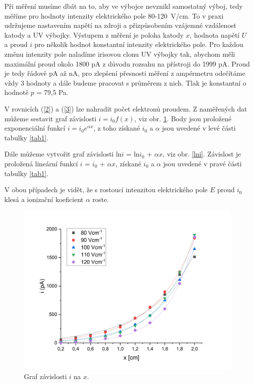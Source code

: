 \documentclass[a4paper,12pt]{article}
\begin{document}
Při měření musíme dbát na to, aby ve výbojce nevznikl samostatný výboj, tedy měříme pro hodnoty intenzity elektrického pole 80-120~V/cm. To v praxi udržujeme nastavením napětí na zdroji a přizpůsobením vzájemné vzdálenost katody a UV výbojky. Výstupem z měření je poloha katody $x$, hodnota napětí $U$ a proud $i$ pro několik hodnot konstantní intenzity elektrického pole. Pro každou změnu intenzity pole naladíme irisovou clonu UV výbojky tak, abychom měli maximální proud okolo 1800 pA z důvodu rozsahu na přístroji do 1999 pA. Proud je tedy řádově pA až nA, pro zlepšení přesnosti měření z ampérmetru odečítáme vždy 3 hodnoty a dále budeme pracovat s průměrem z nich. Tlak je konstantní o hodnotě $p$ = 79,5 Pa.

V rovnicích (\ref{2}) a (\ref{3}) lze nahradit počet elektronů proudem. Z naměřených dat můžeme sestavit graf závislosti $i = i_0 f(x)$, viz obr. \ref{ifx}. Body jsou proložené exponenciální funkcí $i = i_0 e^{\alpha x}$, z toho získané $i_0$ a $\alpha$ jsou uvedené v levé části tabulky \ref{tab1}.

Dále můžeme vytvořit graf závislosti ln$i$ = ln$i_0$ + $\alpha x$, viz obr. \ref{lni}. Závislost je proložená lineární funkcí $i$ = $i_0$ + $\alpha x$, získané $i_0$ a $\alpha$ jsou uvedené v pravé části tabulky \ref{tab1}.

V obou případech je vidět, že s rostoucí intenzitou elektrického pole $E$ proud $i_0$ klesá a ionizační koeficient $\alpha$ roste.

\begin{figure}[h!]
	\centering
	\includegraphics[width=145mm]{ifx.png}
	\caption{Graf závislosti $i$ na $x$.}
	\label{ifx}
\end{figure}
\end{document}
